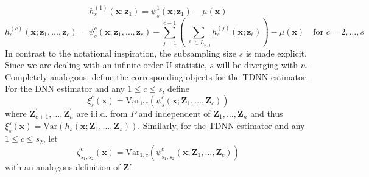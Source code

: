\documentclass[letterpaper,10pt]{article}
\numberwithin{equation}{section}
\numberwithin{thm}{section}
\numberwithin{lem}{section}
\numberwithin{cor}{section}
\newcommand{\1}{\mathbbm{1}}
\newcommand{\Var}{\text{Var}}
\begin{document}
\begin{equation}
	h_{s}^{(1)}\left(\mathbf{x}; \mathbf{z}_{1}\right)
	= \psi_{s}^{1}(\mathbf{x}; \mathbf{z}_{1}) - \mu(\mathbf{x})
\end{equation}
\begin{equation}
	h_{s}^{(c)}\left(\mathbf{x}; \mathbf{z}_{1}, \dotsc, \mathbf{z}_{c}\right)
	= \psi_{s}^{c}(\mathbf{x}; \mathbf{z}_{1}, \dotsc, \mathbf{z}_{c}) - \sum_{j = 1}^{c-1}\left(\sum_{\ell \in L_{n,j}}h_{s}^{(j)}(\mathbf{x}; \mathbf{z}_{\ell})\right) - \mu(\mathbf{x})
	\quad \text{for } c = 2, \dotsc, s
\end{equation}
In contrast to the notational inspiration, the subsampling size $s$ is made explicit.
Since we are dealing with an infinite-order U-statistic, $s$ will be diverging with $n$.
Completely analogous, define the corresponding objects for the TDNN estimator.
For the DNN estimator and any $1 \leq c \leq s$, define
\begin{equation}\label{eq:xi_s_c}
	\xi_{s}^{c}\left(\mathbf{x}\right)
	= \Var_{1:c}\left(\psi_{s}^{c}(\mathbf{x}; \mathbf{Z}_{1}, \dotsc, \mathbf{Z}_{c})\right)
\end{equation}
where $\mathbf{Z}_{c+1}^{\prime}, \ldots, \mathbf{Z}_n^{\prime}$ are i.i.d. from $P$ and independent of $\mathbf{Z}_1, \ldots, \mathbf{Z}_n$ and thus
$\xi_{s}^{s}\left(\mathbf{x}\right) = \Var\left(h_s\left(\mathbf{x}; \mathbf{Z}_1, \ldots, \mathbf{Z}_s\right)\right).$
Similarly, for the TDNN estimator and any $1 \leq c \leq s_2$, let
\begin{equation}\label{eq:zeta_s1s2_c}
	\zeta_{s_1, s_2}^{c}\left(\mathbf{x}\right)
	= \Var_{1:c}\left(\psi_{s_1, s_2}^{c}(\mathbf{x}; \mathbf{Z}_{1}, \dotsc, \mathbf{Z}_{c})\right)
\end{equation}
with an analogous definition of $\mathbf{Z}'$.
\end{document}
